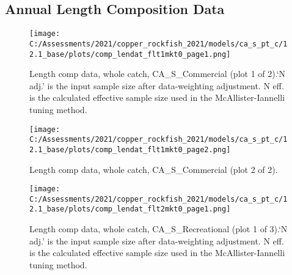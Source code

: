 \documentclass[11pt,
  english,
  a4paper,
]{article}
\begin{document}
\tagmcend\tagstructend

\newpage


\hypertarget{length-data}{%
\subsection{Annual Length Composition Data}\label{length-data}}

\leavevmode\tagmcend\tagstructend


\begin{figure}
\centering
\texttt{[image: C:/Assessments/2021/copper\_rockfish\_2021/models/ca\_s\_pt\_c/12.1\_base/plots/comp\_lendat\_flt1mkt0\_page1.png]}
\caption{Length comp data, whole catch, CA\_S\_Commercial (plot 1 of 2).`N adj.' is the input sample size after data-weighting adjustment. N eff. is the calculated effective sample size used in the McAllister-Iannelli tuning method.\label{fig:comp_lendat_flt1mkt0_page1}}
\end{figure}

\tagmcend\tagstructend


\begin{figure}
\centering
\texttt{[image: C:/Assessments/2021/copper\_rockfish\_2021/models/ca\_s\_pt\_c/12.1\_base/plots/comp\_lendat\_flt1mkt0\_page2.png]}
\caption{Length comp data, whole catch, CA\_S\_Commercial (plot 2 of 2).\label{fig:comp_lendat_flt1mkt0_page2}}
\end{figure}

\tagmcend\tagstructend


\begin{figure}
\centering
\texttt{[image: C:/Assessments/2021/copper\_rockfish\_2021/models/ca\_s\_pt\_c/12.1\_base/plots/comp\_lendat\_flt2mkt0\_page1.png]}
\caption{Length comp data, whole catch, CA\_S\_Recreational (plot 1 of 3).`N adj.' is the input sample size after data-weighting adjustment. N eff. is the calculated effective sample size used in the McAllister-Iannelli tuning method.\label{fig:comp_lendat_flt2mkt0_page1}}
\end{figure}
\end{document}
